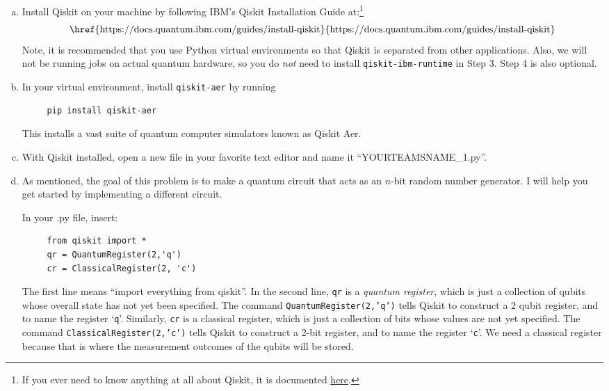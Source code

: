 \documentclass[10pt, cm]{article}
\begin{document}
\begin{enumerate}[(a)]

\item Install Qiskit on your machine by following IBM's Qiskit Installation Guide at:\footnote{If you ever need to know anything at all about Qiskit, it is documented \href{https://docs.quantum.ibm.com/}{here}.}
$$
\text{\href{https://docs.quantum.ibm.com/guides/install-qiskit}{https://docs.quantum.ibm.com/guides/install-qiskit}}
$$
Note, it is recommended that you use Python virtual environments so that Qiskit is separated from other applications. Also, we will not be running jobs on actual quantum hardware, so you do \emph{not} need to install \texttt{qiskit-ibm-runtime} in Step 3. Step 4 is also optional. 

\item In your virtual environment, install \texttt{qiskit-aer} by running 
\begin{verbatim}
     pip install qiskit-aer
\end{verbatim}
This installs a vast suite of quantum computer simulators known as Qiskit Aer.

\item With Qiskit installed, open a new file in your favorite text editor and name it ``YOURTEAMSNAME\_1.py''.

\item As mentioned, the goal of this problem is to make a quantum circuit that acts as an $n$-bit random number generator. I will help you get started by implementing a different circuit.

In your .py file, insert:
\begin{verbatim}
     from qiskit import *
     qr = QuantumRegister(2,'q')
     cr = ClassicalRegister(2, 'c')
\end{verbatim}
The first line means ``import everything from qiskit''. In the second line, \texttt{qr} is a \emph{quantum register}, which is just a collection of qubits whose overall state has not yet been specified. The command \texttt{QuantumRegister(2,'q')} tells Qiskit to construct a 2 qubit register, and to name the register `\texttt{q}'. Similarly, \texttt{cr} is a classical register, which is just a collection of bits whose values are not yet specified. The command \texttt{ClassicalRegister(2,'c')} tells Qiskit to construct a 2-bit register, and to name the register `\texttt{c}'. We need a classical register because that is where the measurement outcomes of the qubits will be stored.


\end{enumerate}
\end{document}

